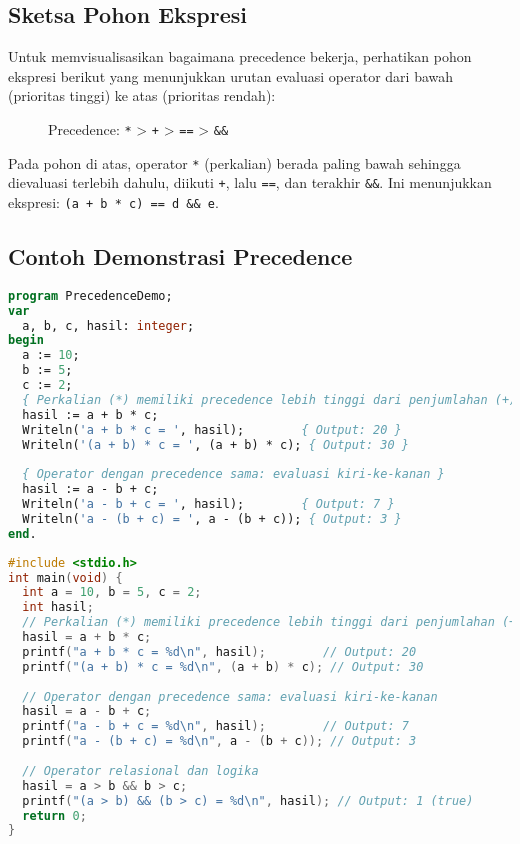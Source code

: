 \documentclass[../main.tex]{subfiles}
\begin{document}
\subsection{Sketsa Pohon Ekspresi}
Untuk memvisualisasikan bagaimana precedence bekerja, perhatikan pohon ekspresi berikut yang menunjukkan urutan evaluasi operator dari bawah (prioritas tinggi) ke atas (prioritas rendah):

\begin{figure}[H]
  \centering
  \caption{Precedence: \texttt{*} \textgreater{} \texttt{+} \textgreater{} \texttt{==} \textgreater{} \texttt{\&\&}}
\end{figure}

Pada pohon di atas, operator \texttt{*} (perkalian) berada paling bawah sehingga dievaluasi terlebih dahulu, diikuti \texttt{+}, lalu \texttt{==}, dan terakhir \texttt{\&\&}. Ini menunjukkan ekspresi: \texttt{(a + b * c) == d \&\& e}.

\subsection{Contoh Demonstrasi Precedence}
\begin{lstlisting}[language=Pascal, caption={Precedence operator di Pascal}]
program PrecedenceDemo;
var
  a, b, c, hasil: integer;
begin
  a := 10;
  b := 5;
  c := 2;
  { Perkalian (*) memiliki precedence lebih tinggi dari penjumlahan (+) }
  hasil := a + b * c;
  Writeln('a + b * c = ', hasil);        { Output: 20 }
  Writeln('(a + b) * c = ', (a + b) * c); { Output: 30 }
  
  { Operator dengan precedence sama: evaluasi kiri-ke-kanan }
  hasil := a - b + c;
  Writeln('a - b + c = ', hasil);        { Output: 7 }
  Writeln('a - (b + c) = ', a - (b + c)); { Output: 3 }
end.
\end{lstlisting}

\begin{lstlisting}[language=C, caption={Precedence operator di C}]
#include <stdio.h>
int main(void) {
  int a = 10, b = 5, c = 2;
  int hasil;
  // Perkalian (*) memiliki precedence lebih tinggi dari penjumlahan (+)
  hasil = a + b * c;
  printf("a + b * c = %d\n", hasil);        // Output: 20
  printf("(a + b) * c = %d\n", (a + b) * c); // Output: 30
  
  // Operator dengan precedence sama: evaluasi kiri-ke-kanan
  hasil = a - b + c;
  printf("a - b + c = %d\n", hasil);        // Output: 7
  printf("a - (b + c) = %d\n", a - (b + c)); // Output: 3
  
  // Operator relasional dan logika
  hasil = a > b && b > c;
  printf("(a > b) && (b > c) = %d\n", hasil); // Output: 1 (true)
  return 0;
}
\end{lstlisting}
\end{document}
